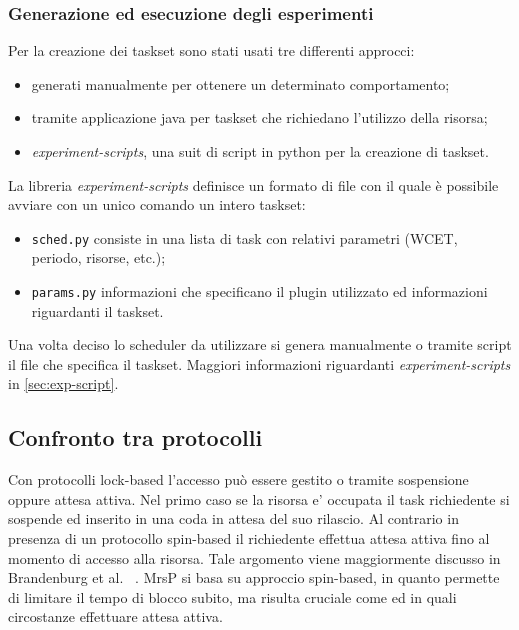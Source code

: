 \subsubsection{Generazione ed esecuzione degli esperimenti}

\noindent Per la creazione dei taskset sono stati usati tre differenti approcci:\\

\begin{itemize}
	\item generati manualmente per ottenere un determinato comportamento;
	\item tramite applicazione java per taskset che richiedano l'utilizzo della risorsa;
	\item \textit{experiment-scripts}, una suit di script in python per la creazione di taskset.
\end{itemize}

\noindent La libreria \textit{experiment-scripts} definisce un formato di file con il quale è possibile avviare con un unico comando un intero taskset:

\begin{itemize}
  \item \texttt{sched.py} consiste in una lista di task con relativi parametri (WCET, periodo, risorse, etc.);
  \item \texttt{params.py} informazioni che specificano il plugin utilizzato ed informazioni riguardanti il taskset.
\end{itemize}

\noindent Una volta deciso lo scheduler da utilizzare si genera manualmente o tramite script il file che specifica il taskset. Maggiori informazioni riguardanti \textit{experiment-scripts} in \ref{sec:exp-script}.\\

\newpage

\subsection{Confronto tra protocolli}
\label{sec:confronto_protocolli}

\noindent Con protocolli lock-based l'accesso può essere gestito o tramite sospensione oppure attesa attiva. Nel primo caso se la risorsa e' occupata il task richiedente si sospende ed inserito in una coda in attesa del suo rilascio. Al contrario in presenza di un protocollo spin-based il richiedente effettua attesa attiva fino al momento di accesso alla risorsa. Tale argomento viene maggiormente discusso in Brandenburg et al. ~\cite{Brandenburg:2008:RSM:1440456.1440601}. MrsP si basa su approccio spin-based, in quanto permette di limitare il tempo di blocco subito, ma risulta cruciale come ed in quali circostanze effettuare attesa attiva.\\

